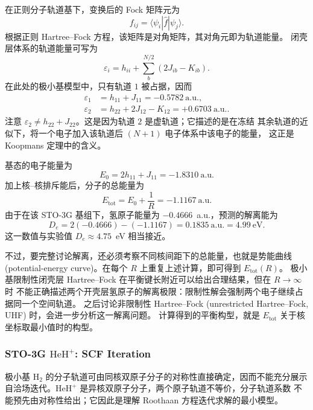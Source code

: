 \documentclass[fontset=none,12pt,a4paper]{ctexart}
\numberwithin{equation}{section}
\begin{document}
在正则分子轨道基下，变换后的 Fock 矩阵元为
\begin{equation}
  f_{ij}=\langle\psi_i|\hat{f}|\psi_j\rangle.
\end{equation}
根据正则 Hartree--Fock 方程，该矩阵是对角矩阵，其对角元即为轨道能量。
闭壳层体系的轨道能量可写为
\begin{equation}
  \varepsilon_i=h_{ii}+\sum_{b}^{N/2}\left(2J_{ib}-K_{ib}\right).
  \label{eq:rhf-orbital-energy-minimal-h2}
\end{equation}
在此处的极小基模型中，只有轨道 $1$ 被占据，因而
\begin{align}
  \varepsilon_1&=h_{11}+J_{11}=-0.5782~\text{a.u.}, \\
  \varepsilon_2&=h_{22}+2J_{12}-K_{12}=+0.6703~\text{a.u.}.
\end{align}
注意 $\varepsilon_2\neq h_{22}+J_{22}$。这是因为轨道 $2$ 是虚轨道；它描述的是在冻结
其余轨道的近似下，将一个电子加入该轨道后 $(N+1)$ 电子体系中该电子的能量，
这正是 Koopmans 定理中的含义。

基态的电子能量为
\begin{equation}
  E_0=2h_{11}+J_{11}=-1.8310~\text{a.u.}
\end{equation}
加上核--核排斥能后，分子的总能量为
\begin{equation}
  E_{\mathrm{tot}}=E_0+\frac{1}{R}=-1.1167~\text{a.u.}
\end{equation}
由于在该 STO-3G 基组下，氢原子能量为 $-0.4666$~a.u.，预测的解离能为
\begin{equation}
  D_e=2(-0.4666)-(-1.1167)=0.1835~\text{a.u.}=4.99~\text{eV}.
\end{equation}
这一数值与实验值 $D_e\approx4.75$~eV 相当接近。

不过，要完整讨论解离，还必须考察不同核间距下的总能量，也就是势能曲线
(potential-energy curve)。在每个 $R$ 上重复上述计算，即可得到 $E_{\mathrm{tot}}(R)$。
极小基限制性闭壳层 Hartree--Fock 在平衡键长附近可以给出合理结果，但在 $R\to\infty$ 时
不能正确描述两个开壳层氢原子的解离极限：限制性解会强制两个电子继续占据同一个空间轨道。
之后讨论非限制性 Hartree--Fock (unrestricted Hartree--Fock, UHF) 时，会进一步分析这一解离问题。
计算得到的平衡构型，就是 $E_{\mathrm{tot}}$ 关于核坐标取最小值时的构型。

\subsubsection{STO-3G \texorpdfstring{$\mathrm{HeH}^{+}$}{HeH+}: SCF Iteration}

极小基 $\mathrm{H}_2$ 的分子轨道可由同核双原子分子的对称性直接确定，因而不能充分展示
自洽场迭代。$\mathrm{HeH}^{+}$ 是异核双原子分子，两个原子轨道不等价，分子轨道系数
不能预先由对称性给出；它因此是理解 Roothaan 方程迭代求解的最小模型。
\end{document}
